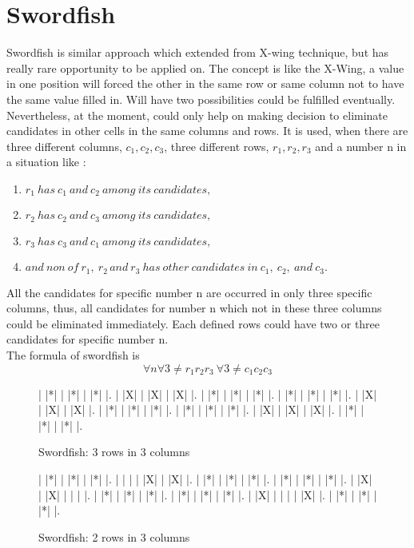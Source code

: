 \documentclass[11pt]{report}
\begin{document}
\section{Swordfish}
\label{sec:Swordfish}
Swordfish is similar approach which extended from X-wing technique, but has really rare opportunity to be applied on. The concept is like the X-Wing, a value in one position will forced the other in the same row or same column not to have the same value filled in. Will have two possibilities could be fulfilled eventually. Nevertheless, at the moment, could only help on making decision to eliminate candidates in other cells in the same columns and rows. It is used, when there are three different columns, $c_{1}, c_{2}, c_{3}$, three different rows, $r_{1}, r_{2}, r_{3}$ and a number n in a situation like :
\begin{enumerate}
  \item $r_{1}\ has\ c_{1}\ and\ c_{2}\ among\ its\ candidates,$
  \item $r_{2}\ has\ c_{2}\ and\ c_{3}\ among\ its\ candidates,$
  \item $r_{3}\ has\ c_{3}\ and\ c_{1}\ among\ its\ candidates,$
  \item $and\ non\ of\ r_{1},\ r_{2}\, and\ r_{3}\ has\ other\ candidates\ in\ c_{1},\ c_{2},\ and\ c_{3}.$
\end{enumerate}
All the candidates for specific number n are occurred in only three specific columns, thus, all candidates for number n which not in these three columns could be eliminated immediately. Each defined rows could have two or three candidates for specific number n.\\
The formula of swordfish is
\[ \forall n \forall 3 \neq r_{1} r_{2} r_{3}\ \forall 3 \neq c_{1} c_{2} c_{3}\]
\begin{figure}
\begin{sudoku}
   | |*| | |*| | |*| |.
   | |X| | |X| | |X| |.
   | |*| | |*| | |*| |.
   | |*| | |*| | |*| |.
   | |X| | |X| | |X| |.
   | |*| | |*| | |*| |.
   | |*| | |*| | |*| |.
   | |X| | |X| | |X| |.
   | |*| | |*| | |*| |.
\end{sudoku}
\label{swordfish}
\caption{Swordfish: 3 rows in 3 columns}
\end{figure}

\begin{figure}
\begin{sudoku}
   | |*| | |*| | |*| |.
   | | | | |X| | |X| |.
   | |*| | |*| | |*| |.
   | |*| | |*| | |*| |.
   | |X| | |X| | | | |.
   | |*| | |*| | |*| |.
   | |*| | |*| | |*| |.
   | |X| | | | | |X| |.
   | |*| | |*| | |*| |.
\end{sudoku}
\label{swordfish}
\caption{Swordfish: 2 rows in 3 columns}
\end{figure}
\end{document}
